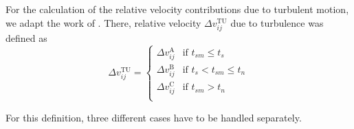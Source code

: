         For the calculation of the relative velocity contributions due to turbulent motion, we 
        adapt the work of \cite{ormel_cuzzi_2007}.
        There, relative velocity $\Delta v^\text{TU}_{ij}$ due to turbulence was defined as
        \begin{equation}
            \Delta v^\text{TU}_{ij} =
            \begin{cases}
                \Delta v_{ij}^\text{A} & \text{if } t_{sm} \leq t_s \\
                \Delta v_{ij}^\text{B} & \text{if } t_s < t_{sm} \leq t_n \\
                \Delta v_{ij}^\text{C} & \text{if } t_{sm} > t_n \\
            \end{cases}
        \end{equation}

        For this definition, three different cases have to be handled separately.

